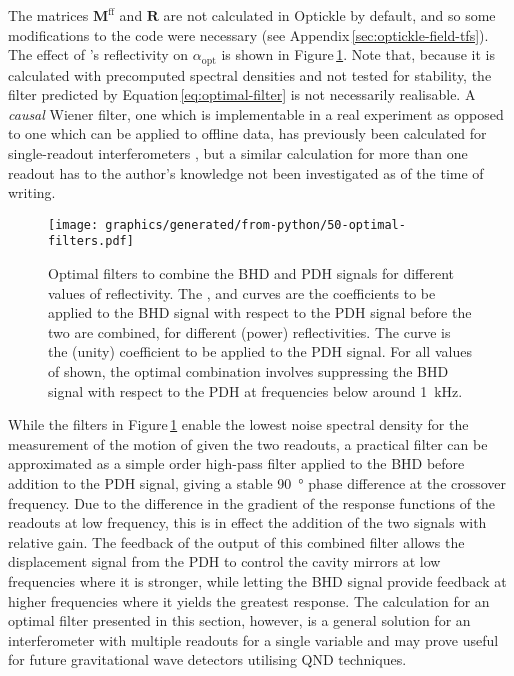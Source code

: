 The matrices $\mathbf{M}^{\textrm{ff}}$ and $\mathbf{R}$ are not calculated in Optickle by default, and so some modifications to the code were necessary (see Appendix\,\ref{sec:optickle-field-tfs}). The effect of \MNINE{}'s reflectivity on $\alpha_{\textrm{opt}}$ is shown in Figure\,\ref{fig:optimal-filters}. Note that, because it is calculated with precomputed spectral densities and not tested for stability, the filter predicted by Equation\,\ref{eq:optimal-filter} is not necessarily realisable. A \emph{causal} Wiener filter, one which is implementable in a real experiment as opposed to one which can be applied to offline data, has previously been calculated for single-readout interferometers \cite{MuellerEbhardt2009, Miao2010}, but a similar calculation for more than one readout has to the author's knowledge not been investigated as of the time of writing.

\begin{figure}
  \texttt{[image: graphics/generated/from-python/50-optimal-filters.pdf]}
  \caption[Optimal filters to combine the balanced homodyne and Pound-Drever-Hall signals for different values of \MNINE{} reflectivity]{\label{fig:optimal-filters}Optimal filters to combine the \gls{BHD} and \gls{PDH} signals for different values of \MNINE{} reflectivity. The ,  and  curves are the coefficients to be applied to the \gls{BHD} signal with respect to the \gls{PDH} signal before the two are combined, for different \MNINE{} (power) reflectivities. The  curve is the (unity) coefficient to be applied to the \gls{PDH} signal. For all values of \MNINE{} shown, the optimal combination involves suppressing the \gls{BHD} signal with respect to the \gls{PDH} at frequencies below around \SI{1}{\kilo\hertz}.}
\end{figure}

While the filters in Figure\,\ref{fig:optimal-filters} enable the lowest noise spectral density for the measurement of the motion of \LMINUS{} given the two readouts, a practical filter can be approximated as a simple  order high-pass filter applied to the \gls{BHD} before addition to the \gls{PDH} signal, giving a stable \SI{90}{\degree} phase difference at the crossover frequency. Due to the difference in the gradient of the response functions of the readouts at low frequency, this is in effect the addition of the two signals with relative gain. The feedback of the output of this combined filter allows the displacement signal from the \gls{PDH} to control the cavity mirrors at low frequencies where it is stronger, while letting the \gls{BHD} signal provide feedback at higher frequencies where it yields the greatest response. The calculation for an optimal filter presented in this section, however, is a general solution for an interferometer with multiple readouts for a single variable and may prove useful for future gravitational wave detectors utilising \gls{QND} techniques.


